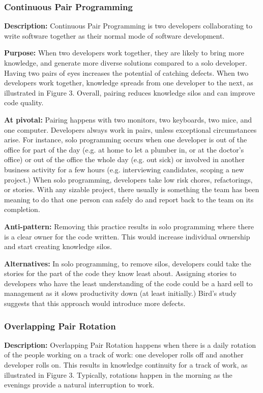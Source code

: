 \begin{table}[]
\subsubsection{Continuous Pair Programming}
\textbf{Description:} Continuous Pair Programming is two developers collaborating to write software together as their normal mode of software development.

\textbf{Purpose:} When two developers work together, they are likely to bring more knowledge, and generate more diverse solutions compared to a solo developer. Having two pairs of eyes increases the potential of catching defects. When two developers work together, knowledge spreads from one developer to the next, as illustrated in Figure 3. Overall, pairing reduces knowledge silos and can improve code quality.

\textbf{At pivotal:} Pairing happens with two monitors, two keyboards, two mice, and one computer. Developers always work in pairs, unless exceptional circumstances arise. For instance, solo programming occurs when one developer is out of the office for part of the day (e.g. at home to let a plumber in, or at the doctor's office) or out of the office the whole day (e.g. out sick) or involved in another business activity for a few hours (e.g. interviewing candidates, scoping a new project.) When solo programming, developers take low risk chores, refactorings, or stories. With any sizable project, there usually is something the team has been meaning to do that one person can safely do and report back to the team on its completion.  

\textbf{Anti-pattern:} Removing this practice results in solo programming where there is a clear owner for the code written. This would increase individual ownership and start creating knowledge silos. 

\textbf{Alternatives:}  In solo programming, to remove silos, developers could take the stories for the part of the code they know least about. Assigning stories to developers who have the least understanding of the code could be a hard sell to management as it slows productivity down (at least initially.) Bird's study \cite{BirdDontTouchMyCode} suggests that this approach would introduce more defects. 

\subsubsection{Overlapping Pair Rotation}
\textbf{Description:} Overlapping Pair Rotation happens when there is a daily rotation of the people working on a track of work: one developer rolls off and another developer rolls on. This results in knowledge continuity for a track of work, as illustrated in Figure 3. Typically, rotations happen in the morning as the evenings provide a natural interruption to work. 


\end{table}
